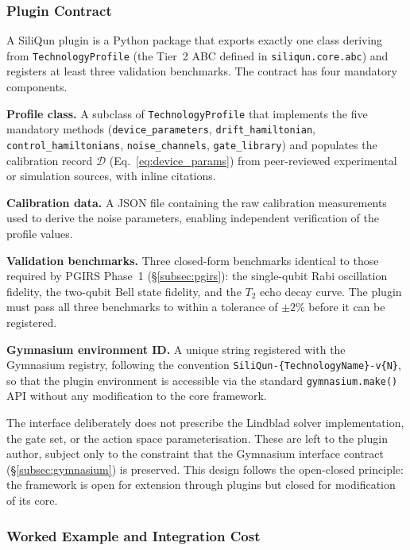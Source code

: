 \subsubsection{Plugin Contract}

A SiliQun plugin is a Python package that exports exactly one class
deriving from \texttt{TechnologyProfile} (the Tier~2 ABC defined in
\texttt{siliqun.core.abc}) and registers at least three validation
benchmarks. The contract has four mandatory components.

\textbf{Profile class.} A subclass of \texttt{TechnologyProfile} that
implements the five mandatory methods (\texttt{device\_parameters},
\texttt{drift\_hamiltonian}, \texttt{control\_hamiltonians},
\texttt{noise\_channels}, \texttt{gate\_library}) and populates the
calibration record $\mathcal{D}$ (Eq.~\ref{eq:device_params}) from
peer-reviewed experimental or simulation sources, with inline citations.

\textbf{Calibration data.} A JSON file containing the raw calibration
measurements used to derive the noise parameters, enabling independent
verification of the profile values.

\textbf{Validation benchmarks.} Three closed-form benchmarks identical
to those required by PGIRS Phase~1 (\S\ref{subsec:pgirs}): the
single-qubit Rabi oscillation fidelity, the two-qubit Bell state
fidelity, and the $T_2$ echo decay curve. The plugin must pass all
three benchmarks to within a tolerance of $\pm 2\%$ before it can be
registered.

\textbf{Gymnasium environment ID.} A unique string registered with the
Gymnasium registry, following the convention
\texttt{SiliQun-\{TechnologyName\}-v\{N\}}, so that the plugin
environment is accessible via the standard \texttt{gymnasium.make()} API
without any modification to the core framework.

The interface deliberately does not prescribe the Lindblad solver
implementation, the gate set, or the action space parameterisation.
These are left to the plugin author, subject only to the constraint that
the Gymnasium interface contract (\S\ref{subsec:gymnasium}) is preserved.
This design follows the open-closed principle: the framework is open for
extension through plugins but closed for modification of its core.

\subsubsection{Worked Example and Integration Cost}


